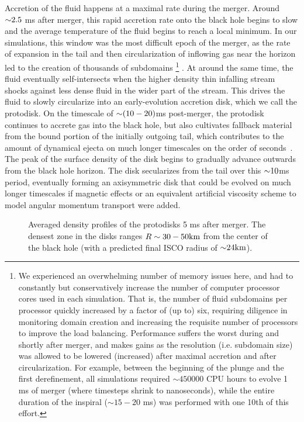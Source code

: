 Accretion of the fluid happens at a maximal rate during the merger. 
Around $\mathord{\sim} 2.5$ ms after merger, this rapid accretion rate onto the black hole begins to slow and the average temperature of the fluid begins to reach a local minimum.
In our simulations, this window was the most difficult epoch of the merger, as the rate of expansion in the tail and then circularization of inflowing gas near the horizon led to the creation of thousands of subdomains
\footnote{
We experienced an overwhelming number of memory issues here, and had to constantly but conservatively increase the number of computer processor cores used in each simulation.
That is, the number of fluid subdomains per processor quickly increased by a factor of (up to) six, requiring diligence in monitoring domain creation and increasing the requisite number of processors to improve the load balancing.
Performance suffers the worst during and shortly after merger, and makes gains as the resolution (i.e. subdomain size) was allowed to be lowered (increased) after maximal accretion and after circularization.  
For example, between the beginning of the plunge and the first derefinement, all simulations required $\sim 450000$ CPU hours to evolve 1 ms of merger (where timesteps shrink to nanoseconds), while the entire duration of the inspiral ($\sim 15 - 20$ ms) was performed with one 10th of this effort. 
}
.
At around the same time, the fluid eventually self-intersects when the higher density thin infalling stream shocks against less dense fluid in the wider part of the stream.
This drives the fluid to slowly circularize into an early-evolution accretion disk, which we call the protodisk.
On the timescale of $\mathord{\sim} (10-20)$ms post-merger, the protodisk continues to accrete gas into the black hole, but also cultivates fallback material from the bound portion of the initially outgoing tail, which contributes to the  amount of dynamical ejecta on much longer timescales on the order of seconds~\cite{Fernandez2013,Just2014}.
The peak of the surface density of the disk begins to gradually advance outwards from the black hole horizon.
The disk secularizes from the tail over this $\mathord{\sim} 10$ms period,
eventually forming an axisymmetric disk that could be evolved on much longer timescales if magnetic effects or an equivalent artificial viscosity scheme to model angular momentum transport were added.

\begin{figure}
	\centering
	
	\caption[Density profiles of the protodisks 5 ms after merger]{
		Averaged density profiles of the protodisks 5 ms after merger.  The densest zone in the disks ranges $R \sim 30 - 50 {\rm km}$ from the center of the black hole (with a predicted final ISCO radius of $\mathord{\sim} 24 {\rm km}$).  
	}
	\label{fig:diskdensities}
\end{figure}

